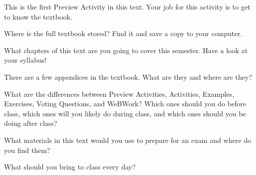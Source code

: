 \begin{pa} \label{PA:0.1}
    This is the first Preview Activity in this text.  Your job for this activity is to get
    to know the textbook.
    \ba
    \item Where is the full textbook stored?  Find it and save a copy to your computer.
    \item What chapters of this text are you going to cover this semester.  Have a look at
        your syllabus!
    \item There are a few appendices in the textbook.  What are they and 
        where are they?
    \item What are the differences between Preview Activities, Activities, Examples,
        Exercises, Voting Questions, and WeBWork?  Which ones should you do before class,
        which ones will you likely do during class, and which ones should you be doing
        after class?
    \item What materials in this text would you use to prepare for an exam and where do
        you find them?
    \item What should you bring to class every day?
    \ea
\end{pa} \afterpa
